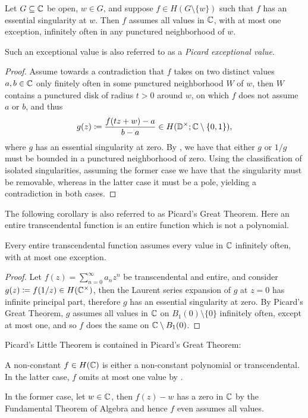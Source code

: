 \begin{theorem} \label{thm:picards-great-theorem}
    Let $G \subseteq \mathbb{C}$ be open, $w \in G$, and suppose $f \in H(G \setminus \{ w \})$ such that $f$ has an essential singularity at $w$. Then $f$ assumes all values in $\mathbb{C}$, with at most one exception, infinitely often in any punctured neighborhood of $w$.
\end{theorem}

Such an exceptional value is also referred to as a \emph{Picard exceptional value}.

\begin{proof}
    Assume towards a contradiction that $f$ takes on two distinct values $a, b \in \mathbb{C}$ only finitely often in some punctured neighborhood $W$ of $w$, then $W$ contains a punctured disk of radius $t > 0$ around $w$, on which $f$ does not assume $a$ or $b$, and thus
    $$ g(z) \coloneqq \frac{f(t z + w) - a}{b - a} \in H(\mathbb{D}^\times; \mathbb{C} \setminus \{ 0, 1 \}), $$
    where $g$ has an essential singularity at zero. By , we have that either $g$ or $1/g$ must be bounded in a punctured neighborhood of zero. Using the classification of isolated singularities, assuming the former case we have that the singularity must be removable, whereas in the latter case it must be a pole, yielding a contradiction in both cases.
\end{proof}

The following corollary is also referred to as Picard's Great Theorem. Here an entire transcendental function is an entire function which is not a polynomial.

\begin{corollary} \label{cor:transcendental-every-value-inf}
    Every entire transcendental function assumes every value in $\mathbb{C}$ infinitely often, with at most one exception.
\end{corollary}

\begin{proof}
    Let $f(z) = \sum_{n=0}^\infty a_n z^n$ be transcendental and entire, and consider $g(z) \coloneqq f(1 / z) \in H(\mathbb{C}^\times)$, then the Laurent series expansion of $g$ at $z = 0$ has infinite principal part, therefore $g$ has an essential singularity at zero. By Picard's Great Theorem, $g$ assumes all values in $\mathbb{C}$ on $B_1(0) \setminus \{ 0 \}$ infinitely often, except at most one, and so $f$ does the same on $\mathbb{C} \setminus B_1(0)$.
\end{proof}

\begin{remark}
    Picard's Little Theorem is contained in Picard's Great Theorem:
    
    A non-constant $f \in H(\mathbb{C})$ is either a non-constant polynomial or transcendental. In the latter case, $f$ omits at most one value by .
    
    In the former case, let $w \in \mathbb{C}$, then $f(z) - w$ has a zero in $\mathbb{C}$ by the Fundamental Theorem of Algebra and hence $f$ even assumes all values.
\end{remark}